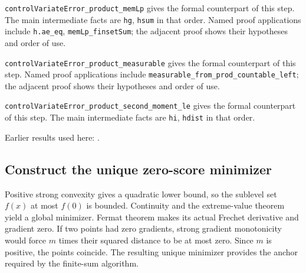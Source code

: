 \documentclass[11pt,a4paper]{report}
\begin{document}
\begin{leanbox}
\texttt{control\allowbreak{}Variate\allowbreak{}Error\_\allowbreak{}product\_\allowbreak{}mem\allowbreak{}Lp} gives the formal counterpart of this step. The main intermediate facts are \texttt{hg}, \texttt{hsum} in that order. Named proof applications include \texttt{h.\allowbreak{}ae\_\allowbreak{}eq}, \texttt{mem\allowbreak{}Lp\_\allowbreak{}finset\allowbreak{}Sum}; the adjacent proof shows their hypotheses and order of use.




\texttt{control\allowbreak{}Variate\allowbreak{}Error\_\allowbreak{}product\_\allowbreak{}measurable} gives the formal counterpart of this step. Named proof applications include \texttt{measurable\_\allowbreak{}from\_\allowbreak{}prod\_\allowbreak{}countable\_\allowbreak{}left}; the adjacent proof shows their hypotheses and order of use.




\texttt{control\allowbreak{}Variate\allowbreak{}Error\_\allowbreak{}product\_\allowbreak{}second\_\allowbreak{}moment\_\allowbreak{}le} gives the formal counterpart of this step. The main intermediate facts are \texttt{hi}, \texttt{hdist} in that order.
\end{leanbox}


Earlier results used here: \cite[Section~3.13.4]{LangevinLean2026ULASC}.
\subsection{\texorpdfstring{Construct the unique zero-score minimizer}{Construct the unique zero-score minimizer}}
\label{report-step-AverageLMC-SGLDEstimator-lean-7}


Positive strong convexity gives a quadratic lower bound, so the sublevel set \(f(x)\) at most \(f(0)\) is bounded. Continuity and the extreme-value theorem yield a global minimizer. Fermat theorem makes its actual Frechet derivative and gradient zero. If two points had zero gradients, strong gradient monotonicity would force \(m\) times their squared distance to be at most zero. Since \(m\) is positive, the points coincide. The resulting unique minimizer provides the anchor required by the finite-sum algorithm.
\end{document}
